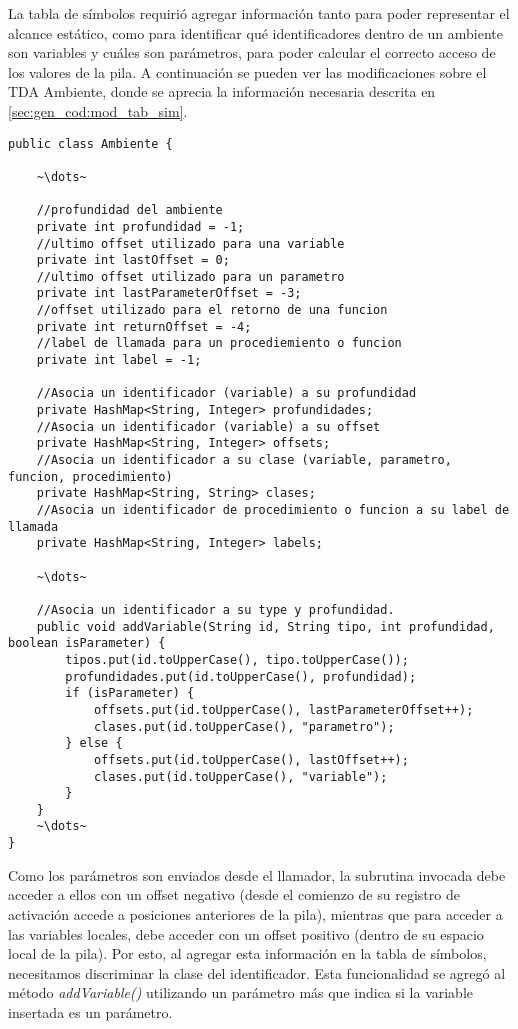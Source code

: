 La tabla de símbolos requirió agregar información tanto para poder representar el alcance estático, como para identificar qué identificadores dentro de un ambiente son variables y cuáles son parámetros, para poder calcular el correcto acceso de los valores de la pila. A continuación se pueden ver las modificaciones sobre el TDA Ambiente, donde se aprecia la información necesaria descrita en \ref{sec:gen_cod:mod_tab_sim}.

\begin{verbatim}
public class Ambiente {
    
    ~\dots~
    
    //profundidad del ambiente
    private int profundidad = -1;
    //ultimo offset utilizado para una variable
    private int lastOffset = 0;
    //ultimo offset utilizado para un parametro
    private int lastParameterOffset = -3;
    //offset utilizado para el retorno de una funcion
    private int returnOffset = -4;
    //label de llamada para un procediemiento o funcion
    private int label = -1;
    
    //Asocia un identificador (variable) a su profundidad
    private HashMap<String, Integer> profundidades;
    //Asocia un identificador (variable) a su offset
    private HashMap<String, Integer> offsets;
    //Asocia un identificador a su clase (variable, parametro, funcion, procedimiento)
    private HashMap<String, String> clases;
    //Asocia un identificador de procedimiento o funcion a su label de llamada
    private HashMap<String, Integer> labels;
    
    ~\dots~
    
    //Asocia un identificador a su type y profundidad.
    public void addVariable(String id, String tipo, int profundidad, boolean isParameter) {
        tipos.put(id.toUpperCase(), tipo.toUpperCase());
        profundidades.put(id.toUpperCase(), profundidad);
        if (isParameter) {
            offsets.put(id.toUpperCase(), lastParameterOffset++);
            clases.put(id.toUpperCase(), "parametro");
        } else {
            offsets.put(id.toUpperCase(), lastOffset++);
            clases.put(id.toUpperCase(), "variable");
        }
    }
    ~\dots~
}
\end{verbatim}

Como los parámetros son enviados desde el llamador, la subrutina invocada debe acceder a ellos con un offset negativo (desde el comienzo de su registro de activación accede a posiciones anteriores de la pila), mientras que para acceder a las variables locales, debe acceder con un offset positivo (dentro de su espacio local de la pila). Por esto, al agregar esta información en la tabla de símbolos, necesitamos discriminar la clase del identificador. Esta funcionalidad se agregó al método \emph{addVariable()} utilizando un parámetro más que indica si la variable insertada es un parámetro.

